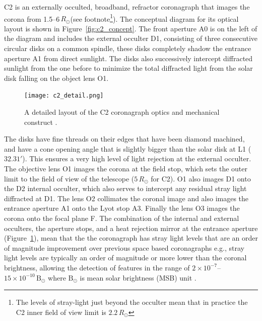 C2 is an externally occulted, broadband, refractor coronagraph that images the corona from 1.5--6$\,R_{\odot}$(see footnote\footnote{The levels of stray-light just beyond the occulter mean that in practice the C2 inner field of view limit is $2.2\,R_{\odot}$}). The conceptual diagram for its optical layout is shown in Figure~\ref{fig:c2_concept}. The front aperture A0 is on the left of the diagram and includes the external occulter D1, consisting of three consecutive circular disks on a common spindle, these disks completely shadow the entrance aperture A1 from direct sunlight. The disks also successively intercept diffracted sunlight from the one before to minimize the total diffracted light from the solar disk falling on the object lens O1. 
\begin{figure}[!t]
\begin{center}
\texttt{[image: c2\_detail.png]}
\caption[The LASCO C2 coronagraph detail]{A detailed layout of the C2 coronagraph optics and mechanical construct \citep{bru95}.}
\label{fig:c2_detail}
\end{center}
\end{figure}
The disks have fine threads on their edges that have been diamond machined, and have a cone opening angle that is slightly bigger than the solar disk at L1 ($32.31'$). This ensures a very high level of light rejection at the external occulter. The objective lens O1 images the corona at the field stop, which sets the outer limit to the field of view of the telescope ($5\,R_{\odot}$ for C2). O1 also images D1 onto the D2 internal occulter, which also serves to intercept any residual stray light diffracted at D1. The lens O2 collimates the coronal image and also images the entrance aperture A1 onto the Lyot stop A3. Finally the lens O3 images the corona onto the focal plane F. The combination of the internal and external occulters, the aperture stops, and a heat rejection mirror at the entrance aperture (Figure~\ref{fig:c2_detail}), mean that the the coronagraph has stray light levels that are an order of magnitude improvement over previous space based coronagraphs e.g., stray light levels are typically an order of magnitude or more lower than the coronal brightness, allowing the detection of features in the range of $2\times10^{-7}$--$15\times10^{-10}\,\mathrm{B}_{\odot}$ where $\mathrm{B}_{\odot}$ is mean solar brightness (MSB) unit \citep{bru95}.

